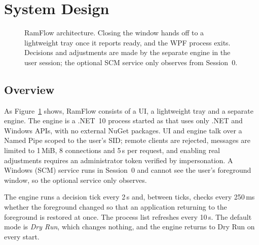 \documentclass[11pt]{article}
\begin{document}
\section{System Design}
\label{sec:design}

\begin{figure}[t]
  \centering
  
  \caption{RamFlow architecture. Closing the window hands off to a lightweight tray once it reports ready, and the WPF process exits. Decisions and adjustments are made by the separate engine in the user session; the optional SCM service only observes from Session~0.}
  \label{fig:arch}
\end{figure}

\subsection{Overview}
As Figure~\ref{fig:arch} shows, RamFlow consists of a UI, a lightweight tray and a separate engine. The engine is a .NET~10 process started as  that uses only .NET and Windows APIs, with no external NuGet packages. UI and engine talk over a Named Pipe scoped to the user's SID; remote clients are rejected, messages are limited to 1\,MiB, 8 connections and 5\,s per request, and enabling real adjustments requires an administrator token verified by impersonation\citep{mspipe}. A Windows (SCM) service runs in Session~0 and cannot see the user's foreground window, so the optional service only observes.

The engine runs a decision tick every 2\,s and, between ticks, checks every 250\,ms whether the foreground changed so that an application returning to the foreground is restored at once. The process list refreshes every 10\,s. The default mode is \emph{Dry Run}, which changes nothing, and the engine returns to Dry Run on every start.
\end{document}
